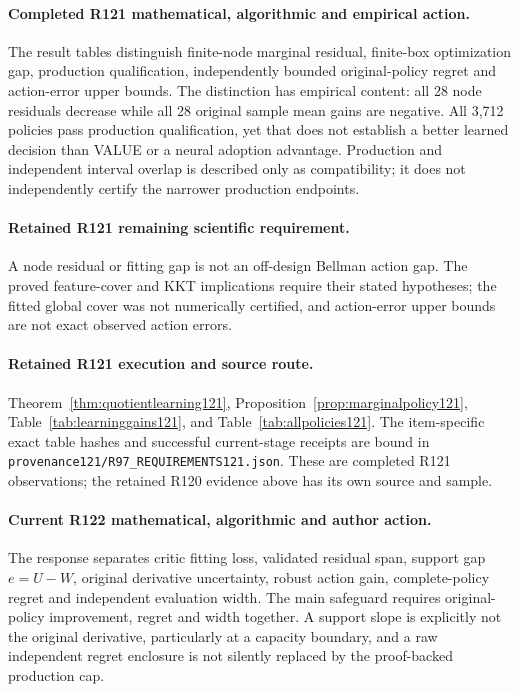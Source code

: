 \paragraph{Completed R121 mathematical, algorithmic and empirical action.}
The result tables distinguish finite-node marginal residual, finite-box optimization gap, production qualification, independently bounded original-policy regret and action-error upper bounds. The distinction has empirical content: all 28 node residuals decrease while all 28 original sample mean gains are negative. All 3,712 policies pass production qualification, yet that does not establish a better learned decision than VALUE or a neural adoption advantage. Production and independent interval overlap is described only as compatibility; it does not independently certify the narrower production endpoints.

\paragraph{Retained R121 remaining scientific requirement.}
A node residual or fitting gap is not an off-design Bellman action gap. The proved feature-cover and KKT implications require their stated hypotheses; the fitted global cover was not numerically certified, and action-error upper bounds are not exact observed action errors.

\paragraph{Retained R121 execution and source route.}
Theorem~\ref{thm:quotientlearning121}, Proposition~\ref{prop:marginalpolicy121}, Table~\ref{tab:learninggains121}, and Table~\ref{tab:allpolicies121}.
The item-specific exact table hashes and successful current-stage receipts are bound in \nolinkurl{provenance121/R97_REQUIREMENTS121.json}. These are completed R121 observations; the retained R120 evidence above has its own source and sample.
\paragraph{Current R122 mathematical, algorithmic and author action.}
The response separates critic fitting loss, validated residual span, support gap $e=U-W$, original derivative uncertainty, robust action gain, complete-policy regret and independent evaluation width. The main safeguard requires original-policy improvement, regret and width together. A support slope is explicitly not the original derivative, particularly at a capacity boundary, and a raw independent regret enclosure is not silently replaced by the proof-backed production cap.
